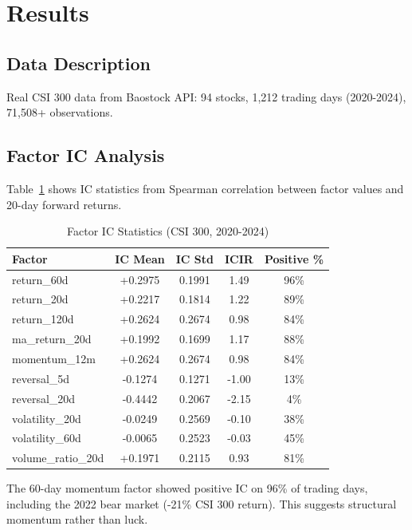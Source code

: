 \section{Results}
\label{sec:results}

\subsection{Data Description}

Real CSI 300 data from Baostock API: 94 stocks, 1,212 trading days (2020-2024), 71,508+ observations.

\subsection{Factor IC Analysis}

Table~\ref{tab:ic} shows IC statistics from Spearman correlation between factor values and 20-day forward returns.

\begin{table}[h]
\centering
\caption{Factor IC Statistics (CSI 300, 2020-2024)}
\label{tab:ic}
\begin{tabular}{lcccc}
\toprule
Factor & IC Mean & IC Std & ICIR & Positive \% \\
\midrule
return\_60d & +0.2975 & 0.1991 & 1.49 & 96\% \\
return\_20d & +0.2217 & 0.1814 & 1.22 & 89\% \\
return\_120d & +0.2624 & 0.2674 & 0.98 & 84\% \\
ma\_return\_20d & +0.1992 & 0.1699 & 1.17 & 88\% \\
momentum\_12m & +0.2624 & 0.2674 & 0.98 & 84\% \\
\midrule
reversal\_5d & -0.1274 & 0.1271 & -1.00 & 13\% \\
reversal\_20d & -0.4442 & 0.2067 & -2.15 & 4\% \\
\midrule
volatility\_20d & -0.0249 & 0.2569 & -0.10 & 38\% \\
volatility\_60d & -0.0065 & 0.2523 & -0.03 & 45\% \\
\midrule
volume\_ratio\_20d & +0.1971 & 0.2115 & 0.93 & 81\% \\
\bottomrule
\end{tabular}
\begin{tablenotes}
\footnotesize
\item The 60-day momentum factor showed positive IC on 96\% of trading days, including the 2022 bear market (-21\% CSI 300 return). This suggests structural momentum rather than luck.
\end{tablenotes}
\end{table}

